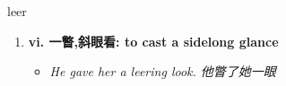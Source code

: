 
\begin{frame}
{\huge leer}
\begin{center}
\begin{enumerate}\Large
  \item \textbf{vi. 一瞥,斜眼看: to cast a sidelong glance}
  \begin{itemize}
    \item \em{\Large{He gave her a leering look. 他瞥了她一眼}}
  \end{itemize}
\end{enumerate}
\end{center}
\end{frame}
